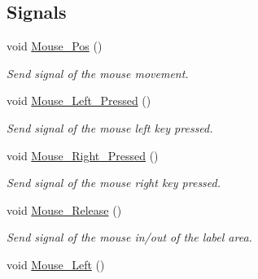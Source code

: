 \subsection*{Signals}
\begin{DoxyCompactItemize}
\item 
void \hyperlink{classQCustomLabel_a45deee93a6a40df2979492a2ff680c88}{Mouse\+\_\+\+Pos} ()\hypertarget{classQCustomLabel_a45deee93a6a40df2979492a2ff680c88}{}\label{classQCustomLabel_a45deee93a6a40df2979492a2ff680c88}

\begin{DoxyCompactList}\small\item\em Send signal of the mouse movement. \end{DoxyCompactList}\item 
void \hyperlink{classQCustomLabel_a6c990d236a4ff2e2898a3e84cd130f9b}{Mouse\+\_\+\+Left\+\_\+\+Pressed} ()\hypertarget{classQCustomLabel_a6c990d236a4ff2e2898a3e84cd130f9b}{}\label{classQCustomLabel_a6c990d236a4ff2e2898a3e84cd130f9b}

\begin{DoxyCompactList}\small\item\em Send signal of the mouse left key pressed. \end{DoxyCompactList}\item 
void \hyperlink{classQCustomLabel_a221ee1658fe8b86dbcc9036e7b740ab8}{Mouse\+\_\+\+Right\+\_\+\+Pressed} ()\hypertarget{classQCustomLabel_a221ee1658fe8b86dbcc9036e7b740ab8}{}\label{classQCustomLabel_a221ee1658fe8b86dbcc9036e7b740ab8}

\begin{DoxyCompactList}\small\item\em Send signal of the mouse right key pressed. \end{DoxyCompactList}\item 
void \hyperlink{classQCustomLabel_a1725399a11e80f0c79f3d1c63cf505ef}{Mouse\+\_\+\+Release} ()\hypertarget{classQCustomLabel_a1725399a11e80f0c79f3d1c63cf505ef}{}\label{classQCustomLabel_a1725399a11e80f0c79f3d1c63cf505ef}

\begin{DoxyCompactList}\small\item\em Send signal of the mouse in/out of the label area. \end{DoxyCompactList}\item 
void \hyperlink{classQCustomLabel_ae5fe8fd62adb9568cfa6d412d6a62948}{Mouse\+\_\+\+Left} ()\hypertarget{classQCustomLabel_ae5fe8fd62adb9568cfa6d412d6a62948}{}\label{classQCustomLabel_ae5fe8fd62adb9568cfa6d412d6a62948}


\end{DoxyCompactItemize}
